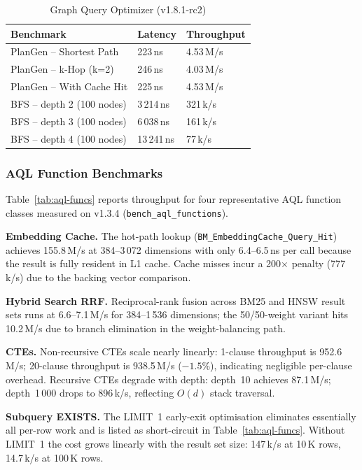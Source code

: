 \documentclass[conference]{IEEEtran}
\begin{document}
\begin{table}[t]
  \caption{Graph Query Optimizer (v1.8.1-rc2)}
  \label{tab:graph-opt}
  \centering
  \begin{tabular}{lR{1.5cm}R{1.5cm}}
    \toprule
    \textbf{Benchmark} & \textbf{Latency} & \textbf{Throughput} \\
    \midrule
    PlanGen -- Shortest Path    & 223\,ns & 4.53\,M/s \\
    PlanGen -- k-Hop (k=2)      & 246\,ns & 4.03\,M/s \\
    PlanGen -- With Cache Hit   & 225\,ns & 4.53\,M/s \\
    BFS -- depth 2 (100 nodes)  & 3\,214\,ns & 321\,k/s \\
    BFS -- depth 3 (100 nodes)  & 6\,038\,ns & 161\,k/s \\
    BFS -- depth 4 (100 nodes)  & 13\,241\,ns & 77\,k/s \\
    \bottomrule
  \end{tabular}
\end{table}

\subsubsection{AQL Function Benchmarks}
\label{sssec:aql-functions}

Table~\ref{tab:aql-funcs} reports throughput for four
representative AQL function classes measured on v1.3.4
(\texttt{bench\_aql\_functions}).

\textbf{Embedding Cache.}
The hot-path lookup (\texttt{BM\_EmbeddingCache\_Query\_Hit}) achieves
155.8\,M/s at 384--3\,072 dimensions with only 6.4--6.5\,ns per call
because the result is fully resident in L1 cache.
Cache misses incur a 200$\times$ penalty (777\,k/s) due to the
backing vector comparison.

\textbf{Hybrid Search RRF.}
Reciprocal-rank fusion across BM25 and HNSW result sets runs at
6.6--7.1\,M/s for 384--1\,536 dimensions; the 50/50-weight variant
hits 10.2\,M/s due to branch elimination in the weight-balancing path.

\textbf{CTEs.}
Non-recursive CTEs scale nearly linearly: 1-clause throughput is
952.6\,M/s; 20-clause throughput is 938.5\,M/s ($-1.5\%$), indicating
negligible per-clause overhead.
Recursive CTEs degrade with depth: depth~10 achieves 87.1\,M/s;
depth~1\,000 drops to 896\,k/s, reflecting $O(d)$ stack traversal.

\textbf{Subquery EXISTS.}
The LIMIT~1 early-exit optimisation eliminates essentially all
per-row work and is listed as short-circuit in
Table~\ref{tab:aql-funcs}.
Without LIMIT~1 the cost grows linearly with the result set size:
147\,k/s at 10\,K rows, 14.7\,k/s at 100\,K rows.
\end{document}
